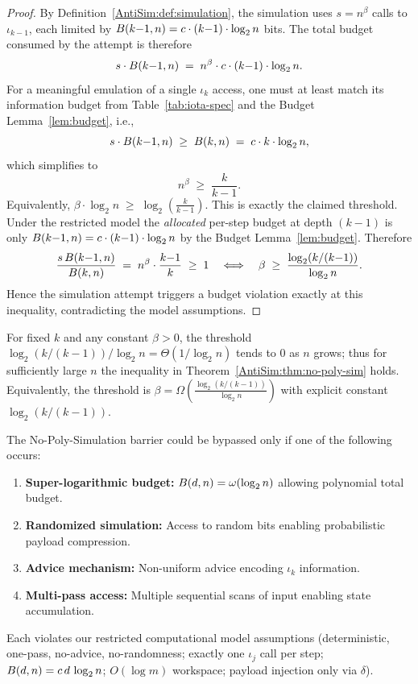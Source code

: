 \begin{proof}
By Definition~\ref{AntiSim:def:simulation}, the simulation uses $s = n^\beta$ calls to $\iota_{k-1}$, each limited by $\B(k{-}1,n)=c \cdot (k{-}1) \cdot \log_{2} n$ bits. The total budget consumed by the attempt is therefore
\[
  s\cdot \B(k{-}1,n) \;=\; n^\beta \cdot c \cdot (k{-}1) \cdot \log_{2} n.
\]
For a meaningful emulation of a single $\iota_k$ access, one must at least match its information budget from Table~\ref{tab:iota-spec} and the Budget Lemma~\ref{lem:budget}, i.e.,
\[
  s\cdot \B(k{-}1,n) 
  \;\geq\; \B(k,n)
  \;=\; c \cdot k \cdot \log_{2} n,
\]
which simplifies to
\[
  n^\beta \;\geq\; \frac{k}{k{-}1}.
\]
Equivalently, $\beta \cdot \log_{2} n 
\;\geq\; \log_{2}\!\left(\tfrac{k}{k-1}\right)$. This is exactly the claimed threshold. Under the restricted model the 
\emph{allocated} per-step budget at depth $(k{-}1)$ is only $\B(k{-}1,n)=c \cdot (k{-}1) \cdot \log_{2} n$ by the Budget Lemma~\ref{lem:budget}. Therefore
\[
\frac{s\,\B(k{-}1,n)}{\B(k,n)} 
\;=\; n^{\beta} \cdot \frac{k{-}1}{k}
\;\geq\; 1
\quad \Longleftrightarrow \quad 
\beta \;\geq\; \frac{\log_{2}(k/(k{-}1))}{\log_{2} n}.
\]
Hence the simulation attempt triggers a budget violation exactly at this inequality, contradicting the model assumptions.
\end{proof}

\begin{remark}
For fixed $k$ and any constant $\beta>0$, the threshold $\log_{2}(k/(k{-}1))/\log_{2} n = \Theta(1/\log_{2} n)$ tends to $0$ as $n$ grows; thus for sufficiently large $n$ the inequality in Theorem~\ref{AntiSim:thm:no-poly-sim} holds. Equivalently, the threshold is $\beta = \Omega\!\left(\tfrac{\log_{2}(k/(k{-}1))}{\log_{2} n}\right)$ with explicit constant $\log_{2}(k/(k{-}1))$.
\end{remark}

\begin{lemma}
\label{AntiSim:lem:failure-modes}
The No-Poly-Simulation barrier could be bypassed only if one of the following occurs:
\begin{enumerate}
  \item \textbf{Super-logarithmic budget:} $\B(d,n) = \omega(\log_{2} n)$ allowing polynomial total budget.
  \item \textbf{Randomized simulation:} Access to random bits enabling probabilistic payload compression.
  \item \textbf{Advice mechanism:} Non-uniform advice encoding $\iota_k$ information.
  \item \textbf{Multi-pass access:} Multiple sequential scans of input enabling state accumulation.
\end{enumerate}
Each violates our restricted computational model assumptions (deterministic, one-pass, no-advice, no-randomness; exactly one $\iota_j$ call per step; $\B(d,n)=c\,d\,\log_{2} n$; $O(\log m)$ workspace; payload injection only via $\delta$).
\end{lemma}

